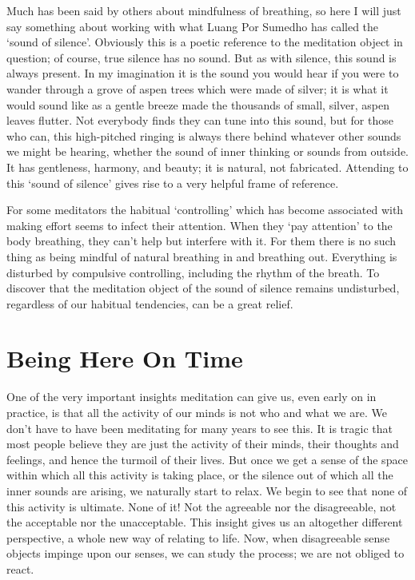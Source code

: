 Much has been said by others about mindfulness of breathing, so here I
will just say something about working with what Luang Por Sumedho has
called the ‘sound of silence’. Obviously this is a poetic reference to
the meditation object in question; of course, true silence has no sound.
But as with silence, this sound is always present. In my imagination it
is the sound you would hear if you were to wander through a grove of
aspen trees which were made of silver; it is what it would sound like as
a gentle breeze made the thousands of small, silver, aspen leaves
flutter. Not everybody finds they can tune into this sound, but for
those who can, this high-pitched ringing is always there behind whatever
other sounds we might be hearing, whether the sound of inner thinking or
sounds from outside. It has gentleness, harmony, and beauty; it is
natural, not fabricated. Attending to this ‘sound of silence’ gives rise
to a very helpful frame of reference.

For some meditators the habitual ‘controlling’ which has become
associated with making effort seems to infect their attention. When they
‘pay attention’ to the body breathing, they can’t help but interfere
with it. For them there is no such thing as being mindful of natural
breathing in and breathing out. Everything is disturbed by compulsive
controlling, including the rhythm of the breath. To discover that the
meditation object of the sound of silence remains undisturbed,
regardless of our habitual tendencies, can be a great relief.

\section{Being Here On Time}

One of the very important insights meditation can give us, even early on
in practice, is that all the activity of our minds is not who and what
we are. We don’t have to have been meditating for many years to see
this. It is tragic that most people believe they are just the activity
of their minds, their thoughts and feelings, and hence the turmoil of
their lives. But once we get a sense of the space within which all this
activity is taking place, or the silence out of which all the inner
sounds are arising, we naturally start to relax. We begin to see that
none of this activity is ultimate. None of it! Not the agreeable nor the
disagreeable, not the acceptable nor the unacceptable. This insight
gives us an altogether different perspective, a whole new way of
relating to life. Now, when disagreeable sense objects impinge upon our
senses, we can study the process; we are not obliged to react.

